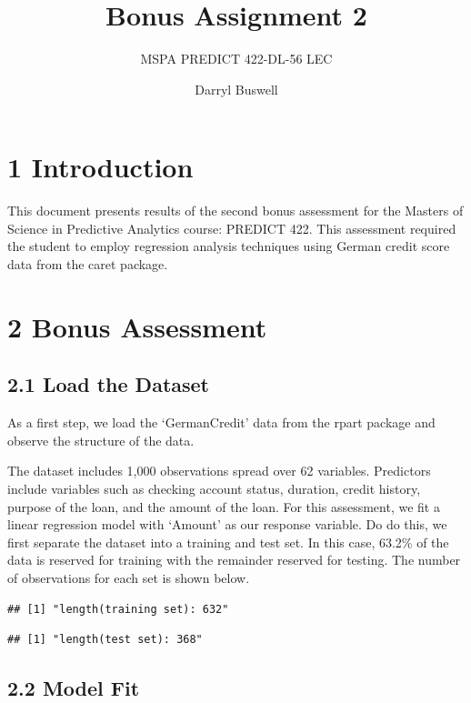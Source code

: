 \documentclass[]{article}
\title{Bonus Assignment 2}
\subtitle{MSPA PREDICT 422-DL-56 LEC}
\author{Darryl Buswell}
\date{}
\begin{document}
\maketitle

\section{1 Introduction}\label{introduction}

This document presents results of the second bonus assessment for the
Masters of Science in Predictive Analytics course: PREDICT 422. This
assessment required the student to employ regression analysis techniques
using German credit score data from the caret package.

\section{2 Bonus Assessment}\label{bonus-assessment}

\subsection{2.1 Load the Dataset}\label{load-the-dataset}

As a first step, we load the `GermanCredit' data from the rpart package
and observe the structure of the data.

The dataset includes 1,000 observations spread over 62 variables.
Predictors include variables such as checking account status, duration,
credit history, purpose of the loan, and the amount of the loan. For
this assessment, we fit a linear regression model with `Amount' as our
response variable. Do do this, we first separate the dataset into a
training and test set. In this case, 63.2\% of the data is reserved for
training with the remainder reserved for testing. The number of
observations for each set is shown below.

\begin{verbatim}
## [1] "length(training set): 632"
\end{verbatim}

\begin{verbatim}
## [1] "length(test set): 368"
\end{verbatim}

\subsection{2.2 Model Fit}\label{model-fit}
\end{document}
